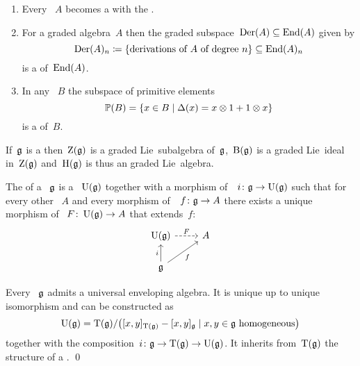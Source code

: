 \documentclass[a4paper,10pt,headings=standardclasses]{scrartcl}
\begin{document}
\begin{example}
  \leavevmode
  \begin{enumerate}
    \item
      Every {\dga}~$A$ becomes a {\dgl} with the {\dgcom}.
    \item
      For a graded algebra~$A$ then the graded subspace~$\operatorname{Der}(A) \subseteq \operatorname{End}(A)$ given by
      \[
        \operatorname{Der}(A)_n
        \coloneqq
        \{
          \text{derivations of~$A$ of degree~$n$}
        \}
        \subseteq
        \operatorname{End}(A)_n
      \]
      is a {\dglsub} of~$\operatorname{End}(A)$.
    \item
      In any {\dgb}~$B$ the subspace of primitive elements
      \[
        \prim(B)
        =
        \{
          x \in B
        \suchthat
          \Delta(x) = x \tensor 1 + 1 \tensor x
        \}
      \]
      is a {\dglsub} of~$B$.
  \end{enumerate}
\end{example}

\begin{lemma}
  If~$\mathfrak{g}$ is a {\dgl} then~$\operatorname{Z}(\mathfrak{g})$ is a graded Lie~subalgebra of~$\mathfrak{g}$,~$\operatorname{B}(\mathfrak{g})$ is a graded Lie~ideal in~$\operatorname{Z}(\mathfrak{g})$ and~$\operatorname{H}(\mathfrak{g})$ is thus an graded Lie~algebra. 
\end{lemma}


\begin{definition}
  The  of a {\dgl}~$\mathfrak{g}$ is a {\dga}~$\operatorname{U}(\mathfrak{g})$ together with a morphism of~{\dgls}~$i \colon \mathfrak{g} \to \operatorname{U}(\mathfrak{g})$ such that for every other {\dga}~$A$ and every morphism of~{\dgls}~$f \colon \mathfrak{g} \to A$ there exists a unique morphism of {\dgas}~$F \colon \operatorname{U}(\mathfrak{g}) \to A$ that extends~$f$:
  \[
    \begin{tikzcd}
      \Univ(\glie)
      \arrow[dashed]{r}[above]{F}
      &
      A
      \\
      \glie
      \arrow{u}[left]{i}
      \arrow{ur}[below right]{f}
      &
      {}
    \end{tikzcd}
  \]
\end{definition}

\begin{proposition}
  Every {\dgl}~$\mathfrak{g}$ admits a universal enveloping algebra.
  It is unique up to unique isomorphism and can be constructed as
  \[
    \Univ(\glie)
    =
    \dgTensor(\glie)
    /
    \bigl(
      [x,y]_{\dgTensor(\glie)} - [x,y]_{\glie}
    \suchthat
      \text{$x, y \in \glie$ homogeneous}
    \bigr)
  \]
  together with the composition~$i \colon \mathfrak{g} \to \operatorname{T}(\mathfrak{g}) \to \operatorname{U}(\mathfrak{g})$.
  It inherits from~$\operatorname{T}(\mathfrak{g})$ the structure of a {\dgh}.
  \qed
\end{proposition}
\end{document}
